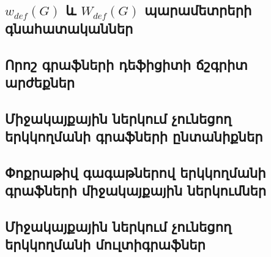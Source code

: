 \documentclass[notheorems]{beamer}
\begin{document}
\subsection{\texorpdfstring{$w_{def}(G)$}{w\_def(G)} և \texorpdfstring{$W_{def}(G)$}{W\_def(G)} պարամետրերի գնահատականներ} \label{s_wdef}




\subsection{Որոշ գրաֆների դեֆիցիտի ճշգրիտ արժեքներ}




\subsection{Միջակայքային ներկում չունեցող երկկողմանի գրաֆների ընտանիքներ}




\subsection {Փոքրաթիվ գագաթներով երկկողմանի գրաֆների միջակայքային ներկումներ}




\subsection{Միջակայքային ներկում չունեցող երկկողմանի մուլտիգրաֆներ}







% 
\end{document}
